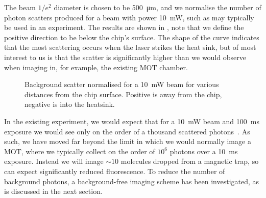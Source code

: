 The beam $1/e^2$ diameter is chosen to be \SI{500}{\micro\meter}, and we
normalise the number of photon scatters produced for a beam with power
\SI{10}{\milli\watt}, such as may typically be used in an experiment. The
results are shown in , note that we define the
positive direction to be below the chip's surface. The shape of the curve
indicates that the most scattering occurs when the laser strikes the heat sink,
but of most interest to us is that the scatter is significantly higher than we
would observe when imaging in, for example, the existing MOT chamber.


\begin{figure}
  \centering
  \caption[Background scatter from the chip]{
    Background scatter normalised for a \SI{10}{\milli\watt} beam for
  various distances from the chip surface. Positive is away from the chip,
negative is into the heatsink.}
  \label{exper:fig:scatter}
\end{figure}

In the existing experiment, we would expect that for a \SI{10}{\milli\watt}
beam and \SI{100}{\milli\second} exposure we would see only on the order of a
thousand scattered photons~\cite{Williams2018}. As such, we have moved far
beyond the limit in which we would normally image a MOT, where we typically
collect on the order of $10^6$ photons over a \SI{10}{\milli\second} exposure.
Instead we will image $\sim10$ molecules dropped from a magnetic trap, so can
expect significantly reduced fluorescence.  To reduce the number of background
photons, a background-free imaging scheme has been investigated, as is
discussed in the next section.

